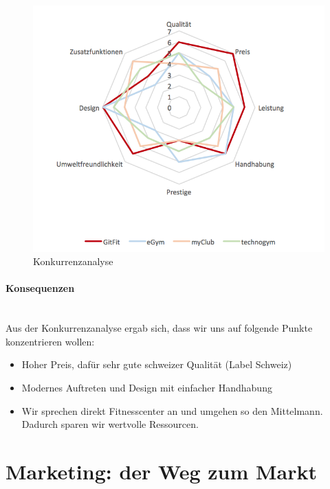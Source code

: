 \begin{figure}[H]
\centering
\includegraphics[width=0.9\linewidth]{images/konkurrenz}
\caption{Konkurrenzanalyse}
\label{fig:konkurrenz}
\end{figure}
\paragraph{Konsequenzen}\hfill \\
Aus der Konkurrenzanalyse ergab sich, dass wir uns auf folgende Punkte konzentrieren wollen:
\begin{itemize}
	\item Hoher Preis, dafür sehr gute schweizer Qualität (Label Schweiz)
	\item Modernes Auftreten und Design mit einfacher Handhabung
	\item Wir sprechen direkt Fitnesscenter an und umgehen so den Mittelmann. Dadurch sparen wir wertvolle Ressourcen.
\end{itemize}

\section{Marketing: der Weg zum Markt}

